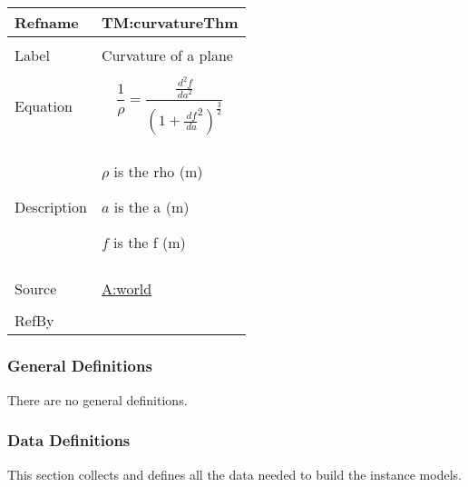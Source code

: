 \documentclass[12pt]{article}
\begin{document}
\vspace{\baselineskip}
\noindent
\begin{minipage}{\textwidth}
\begin{tabular}{>{\raggedright}p{}>{\raggedright\arraybackslash}p{}}
\toprule \textbf{Refname} & \textbf{TM:curvatureThm}
\label{TM:curvatureThm}
\\ \midrule \\
Label & Curvature of a plane
        
\\ \midrule \\
Equation & \begin{displaymath}
           \frac{1}{ρ}=\frac{\frac{\,d^{2}f}{\,da^{2}}}{\left(1+\frac{\,df}{\,da}^{2}\right)^{\frac{3}{2}}}
           \end{displaymath}
\\ \midrule \\
Description & \begin{symbDescription}
              \item{$ρ$ is the rho (${\text{m}}$)}
              \item{$a$ is the a (${\text{m}}$)}
              \item{$f$ is the f (${\text{m}}$)}
              \end{symbDescription}
\\ \midrule \\
Source & \hyperref[world]{A:world}
         
\\ \midrule \\
RefBy & 
\\ \bottomrule
\end{tabular}
\end{minipage}
\subsubsection{General Definitions}
\label{Sec:GDs}
There are no general definitions.

\subsubsection{Data Definitions}
\label{Sec:DDs}
This section collects and defines all the data needed to build the instance models.
\end{document}
